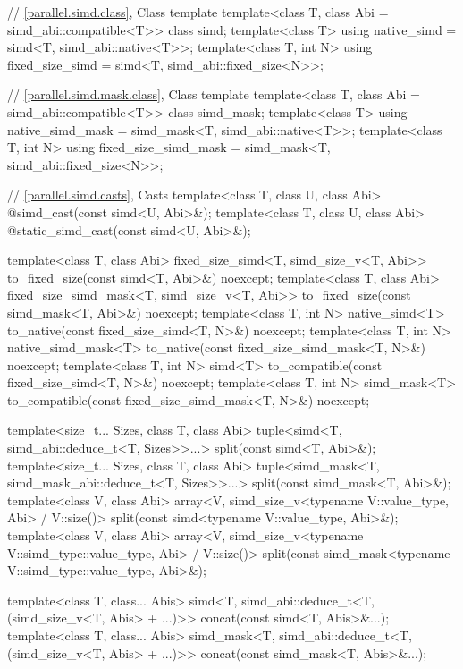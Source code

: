 \begin{codeblock}
{{  // \ref{parallel.simd.class}, Class template 
  template<class T, class Abi = simd_abi::compatible<T>> class simd;
  template<class T> using native_simd = simd<T, simd_abi::native<T>>;
  template<class T, int N> using fixed_size_simd = simd<T, simd_abi::fixed_size<N>>;

  // \ref{parallel.simd.mask.class}, Class template 
  template<class T, class Abi = simd_abi::compatible<T>> class simd_mask;
  template<class T> using native_simd_mask = simd_mask<T, simd_abi::native<T>>;
  template<class T, int N> using fixed_size_simd_mask =
    simd_mask<T, simd_abi::fixed_size<N>>;

  // \ref{parallel.simd.casts}, Casts
  template<class T, class U, class Abi> @\seebelow@ simd_cast(const simd<U, Abi>&);
  template<class T, class U, class Abi> @\seebelow@ static_simd_cast(const simd<U, Abi>&);

  template<class T, class Abi>
    fixed_size_simd<T, simd_size_v<T, Abi>>
      to_fixed_size(const simd<T, Abi>&) noexcept;
  template<class T, class Abi>
    fixed_size_simd_mask<T, simd_size_v<T, Abi>>
      to_fixed_size(const simd_mask<T, Abi>&) noexcept;
  template<class T, int N>
    native_simd<T> to_native(const fixed_size_simd<T, N>&) noexcept;
  template<class T, int N>
    native_simd_mask<T> to_native(const fixed_size_simd_mask<T, N>&) noexcept;
  template<class T, int N>
    simd<T> to_compatible(const fixed_size_simd<T, N>&) noexcept;
  template<class T, int N>
    simd_mask<T> to_compatible(const fixed_size_simd_mask<T, N>&) noexcept;

  template<size_t... Sizes, class T, class Abi>
    tuple<simd<T, simd_abi::deduce_t<T, Sizes>>...>
      split(const simd<T, Abi>&);
  template<size_t... Sizes, class T, class Abi>
    tuple<simd_mask<T, simd_mask_abi::deduce_t<T, Sizes>>...>
      split(const simd_mask<T, Abi>&);
  template<class V, class Abi>
    array<V, simd_size_v<typename V::value_type, Abi> / V::size()>
      split(const simd<typename V::value_type, Abi>&);
  template<class V, class Abi>
    array<V, simd_size_v<typename V::simd_type::value_type, Abi> / V::size()>
      split(const simd_mask<typename V::simd_type::value_type, Abi>&);

  template<class T, class... Abis>
    simd<T, simd_abi::deduce_t<T, (simd_size_v<T, Abis> + ...)>>
      concat(const simd<T, Abis>&...);
  template<class T, class... Abis>
    simd_mask<T, simd_abi::deduce_t<T, (simd_size_v<T, Abis> + ...)>>
      concat(const simd_mask<T, Abis>&...);

}}
\end{codeblock}
